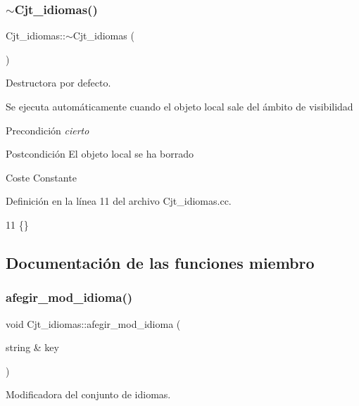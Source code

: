 \subsubsection{\texorpdfstring{$\sim$\+Cjt\+\_\+idiomas()}{~Cjt\_idiomas()}}
{\footnotesize\ttfamily Cjt\+\_\+idiomas\+::$\sim$\+Cjt\+\_\+idiomas (\begin{DoxyParamCaption}{ }\end{DoxyParamCaption})}



Destructora por defecto. 

Se ejecuta automáticamente cuando el objeto local sale del ámbito de visibilidad \begin{DoxyPrecond}{Precondición}
{\itshape cierto} 
\end{DoxyPrecond}
\begin{DoxyPostcond}{Postcondición}
El objeto local se ha borrado 
\end{DoxyPostcond}
\begin{DoxyParagraph}{Coste}
Constante 
\end{DoxyParagraph}


Definición en la línea 11 del archivo Cjt\+\_\+idiomas.\+cc.


\begin{DoxyCode}
11 \{\}
\end{DoxyCode}


\subsection{Documentación de las funciones miembro}
\mbox{\label{class_cjt__idiomas_a1e38b16ba4bb49a91589c85ec7775a5f}} 
\subsubsection{\texorpdfstring{afegir\+\_\+mod\+\_\+idioma()}{afegir\_mod\_idioma()}}
{\footnotesize\ttfamily void Cjt\+\_\+idiomas\+::afegir\+\_\+mod\+\_\+idioma (\begin{DoxyParamCaption}\item[{string \&}]{key }\end{DoxyParamCaption})}



Modificadora del conjunto de idiomas. 

